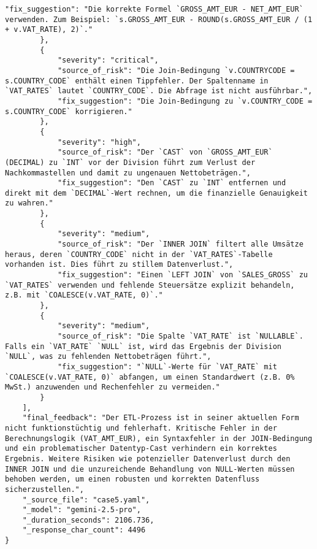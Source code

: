\begin{lstlisting}[caption={Ausgabe: GEMINI 2.5 Pro Anwendungsfall 5 Konsistenzdurchlauf},label={gemini_case5_prompt2}]
            "fix_suggestion": "Die korrekte Formel `GROSS_AMT_EUR - NET_AMT_EUR` verwenden. Zum Beispiel: `s.GROSS_AMT_EUR - ROUND(s.GROSS_AMT_EUR / (1 + v.VAT_RATE), 2)`."
        },
        {
            "severity": "critical",
            "source_of_risk": "Die Join-Bedingung `v.COUNTRYCODE = s.COUNTRY_CODE` enthält einen Tippfehler. Der Spaltenname in `VAT_RATES` lautet `COUNTRY_CODE`. Die Abfrage ist nicht ausführbar.",
            "fix_suggestion": "Die Join-Bedingung zu `v.COUNTRY_CODE = s.COUNTRY_CODE` korrigieren."
        },
        {
            "severity": "high",
            "source_of_risk": "Der `CAST` von `GROSS_AMT_EUR` (DECIMAL) zu `INT` vor der Division führt zum Verlust der Nachkommastellen und damit zu ungenauen Nettobeträgen.",
            "fix_suggestion": "Den `CAST` zu `INT` entfernen und direkt mit dem `DECIMAL`-Wert rechnen, um die finanzielle Genauigkeit zu wahren."
        },
        {
            "severity": "medium",
            "source_of_risk": "Der `INNER JOIN` filtert alle Umsätze heraus, deren `COUNTRY_CODE` nicht in der `VAT_RATES`-Tabelle vorhanden ist. Dies führt zu stillem Datenverlust.",
            "fix_suggestion": "Einen `LEFT JOIN` von `SALES_GROSS` zu `VAT_RATES` verwenden und fehlende Steuersätze explizit behandeln, z.B. mit `COALESCE(v.VAT_RATE, 0)`."
        },
        {
            "severity": "medium",
            "source_of_risk": "Die Spalte `VAT_RATE` ist `NULLABLE`. Falls ein `VAT_RATE` `NULL` ist, wird das Ergebnis der Division `NULL`, was zu fehlenden Nettobeträgen führt.",
            "fix_suggestion": "`NULL`-Werte für `VAT_RATE` mit `COALESCE(v.VAT_RATE, 0)` abfangen, um einen Standardwert (z.B. 0% MwSt.) anzuwenden und Rechenfehler zu vermeiden."
        }
    ],
    "final_feedback": "Der ETL-Prozess ist in seiner aktuellen Form nicht funktionstüchtig und fehlerhaft. Kritische Fehler in der Berechnungslogik (VAT_AMT_EUR), ein Syntaxfehler in der JOIN-Bedingung und ein problematischer Datentyp-Cast verhindern ein korrektes Ergebnis. Weitere Risiken wie potenzieller Datenverlust durch den INNER JOIN und die unzureichende Behandlung von NULL-Werten müssen behoben werden, um einen robusten und korrekten Datenfluss sicherzustellen.",
    "_source_file": "case5.yaml",
    "_model": "gemini-2.5-pro",
    "_duration_seconds": 2106.736,
    "_response_char_count": 4496
}
\end{lstlisting}

